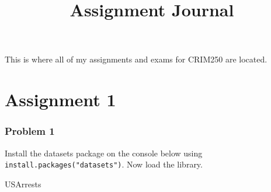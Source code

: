 \documentclass[
]{article}
\title{Assignment Journal}
\author{}
\date{\vspace{-2.5em}}
\newenvironment{Shaded}{\begin{snugshade}}{\end{snugshade}}
\newcommand{\NormalTok}[1]{#1}
\begin{document}
\maketitle

{
\setcounter{tocdepth}{1}
\tableofcontents
}
This is where all of my assignments and exams for CRIM250 are located.

\hypertarget{assignment-1}{%
\section{Assignment 1}\label{assignment-1}}

\hypertarget{problem-1}{%
\subsubsection{Problem 1}\label{problem-1}}

Install the datasets package on the console below using
\texttt{install.packages("datasets")}. Now load the library.

\begin{Shaded}
\begin{Highlighting}[]
\NormalTok{USArrests}
\end{Highlighting}
\end{Shaded}
\end{document}

